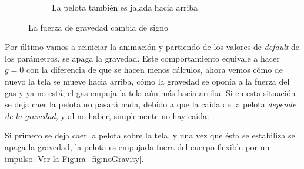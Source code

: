 \begin{figure}
\begin{subfigure}[b]{0.45\textwidth}
    \caption{La pelota también es jalada hacia arriba}
    \label{fig:testGpos2}
  \end{subfigure}
 \caption[Experimento: $g > 0$]{La fuerza de gravedad cambia de signo} 
 \label{fig:positiveGravity}
\end{figure}

Por último vamos a reiniciar la animación y partiendo de los valores de \emph{\textenglish{default}} de los parámetros, se apaga la gravedad. 
Este comportamiento equivale a hacer $g=0$ con la diferencia de que se hacen menos cálculos, ahora vemos cómo de nuevo la tela se mueve hacia arriba, cómo la gravedad se oponía a la fuerza del gas y ya no está, el gas empuja la tela aún más hacia arriba.
Si en esta situación se deja caer la pelota no pasará nada, debido a que la caída de la pelota \emph{depende de la gravedad}, y al no haber, simplemente no hay caída.

Si primero se deja caer la pelota sobre la tela, y una vez que ésta se estabiliza se apaga la gravedad, la pelota es empujada fuera del cuerpo flexible por un impulso.
Ver la Figura~\ref{fig:noGravity}.

